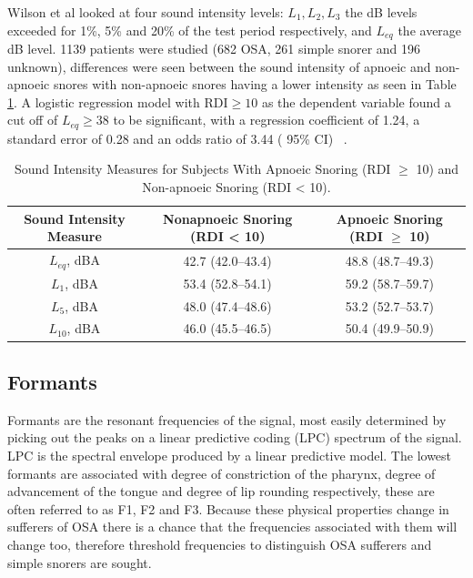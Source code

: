 Wilson et al looked at four sound intensity levels: $L_{1}, L_{2}, L_{3}$ the dB levels exceeded for 1\%, 5\% and 20\% of the test period respectively, and $L_{eq}$ the average dB level. 1139 patients were studied (682 OSA, 261 simple snorer and 196 unknown), differences were seen between the sound intensity of apnoeic and non-apnoeic snores with non-apnoeic snores having a lower intensity as seen in Table \ref{table:wilson}. A logistic regression model with $\text{RDI} \geq 10$ as the dependent variable found a cut off of $L_{eq} \geq 38$ to be significant, with a regression coefficient of 1.24, a standard error of 0.28 and an odds ratio of 3.44 ( 95\% CI) ~\cite{wilson1999snoring}.

\begin{table}[h]
\centering
\begin{tabular}{c c c}
\toprule
Sound Intensity Measure&Nonapnoeic Snoring (RDI < 10)&Apnoeic Snoring (RDI $\geq$ 10)\\ \midrule
$L_{eq}$, dBA&42.7 (42.0–43.4)&48.8 (48.7–49.3)\\ 
$L_{1}$, dBA&53.4 (52.8–54.1)&59.2 (58.7–59.7)\\ 
$L_{5}$, dBA&48.0 (47.4–48.6)&53.2 (52.7–53.7)\\ 
$L_{10}$, dBA&46.0 (45.5–46.5)&50.4 (49.9–50.9)\\ \bottomrule
\end{tabular}
\caption{Sound Intensity Measures for Subjects With Apnoeic Snoring (RDI $\geq$ 10) and Non-apnoeic Snoring (RDI < 10).}
\label{table:wilson}
\end{table}
\subsection{Formants}
Formants are the resonant frequencies of the signal, most easily determined by picking out the peaks on a linear predictive coding (LPC) spectrum of the signal. LPC is the spectral envelope produced by a linear predictive model. The lowest formants are associated with degree of constriction of the pharynx, degree of advancement of the tongue and degree of lip rounding respectively, these are often referred to as F1, F2 and F3. Because these physical properties change in sufferers of OSA there is a chance that the frequencies associated with them will change too, therefore threshold frequencies to distinguish OSA sufferers and simple snorers are sought. 

